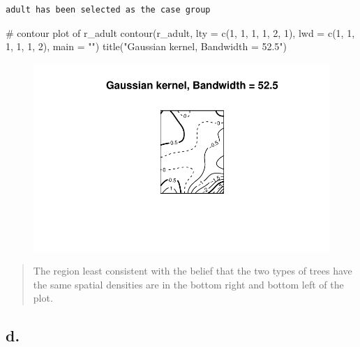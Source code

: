 \documentclass[
  letterpaper,
  DIV=11,
  numbers=noendperiod]{scrartcl}
\newenvironment{Shaded}{\begin{snugshade}}{\end{snugshade}}
\newcommand{\AttributeTok}[1]{\textcolor[rgb]{0.40,0.45,0.13}{#1}}
\newcommand{\CommentTok}[1]{\textcolor[rgb]{0.37,0.37,0.37}{#1}}
\newcommand{\DecValTok}[1]{\textcolor[rgb]{0.68,0.00,0.00}{#1}}
\newcommand{\FunctionTok}[1]{\textcolor[rgb]{0.28,0.35,0.67}{#1}}
\newcommand{\NormalTok}[1]{\textcolor[rgb]{0.00,0.23,0.31}{#1}}
\newcommand{\StringTok}[1]{\textcolor[rgb]{0.13,0.47,0.30}{#1}}
\begin{document}
\begin{verbatim}
adult has been selected as the case group
\end{verbatim}

\begin{Shaded}
\begin{Highlighting}[]
\CommentTok{\# contour plot of r\_adult}
\FunctionTok{contour}\NormalTok{(r\_adult, }\AttributeTok{lty =} \FunctionTok{c}\NormalTok{(}\DecValTok{1}\NormalTok{, }\DecValTok{1}\NormalTok{, }\DecValTok{1}\NormalTok{, }\DecValTok{1}\NormalTok{, }\DecValTok{2}\NormalTok{, }\DecValTok{1}\NormalTok{),}
        \AttributeTok{lwd =} \FunctionTok{c}\NormalTok{(}\DecValTok{1}\NormalTok{, }\DecValTok{1}\NormalTok{, }\DecValTok{1}\NormalTok{, }\DecValTok{1}\NormalTok{, }\DecValTok{1}\NormalTok{, }\DecValTok{2}\NormalTok{), }\AttributeTok{main =} \StringTok{""}\NormalTok{)}
\FunctionTok{title}\NormalTok{(}\StringTok{"Gaussian kernel, Bandwidth = 52.5"}\NormalTok{)}
\end{Highlighting}
\end{Shaded}

\begin{figure}[H]

{\centering \includegraphics{cc-r-kd-hw_files/figure-pdf/unnamed-chunk-11-1.pdf}

}

\end{figure}

\begin{quote}
The region least consistent with the belief that the two types of trees
have the same spatial densities are in the bottom right and bottom left
of the plot.
\end{quote}

\hypertarget{d.-1}{%
\subsection{d.}\label{d.-1}}
\end{document}
